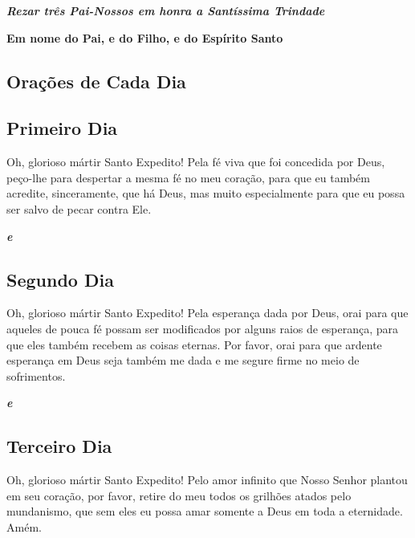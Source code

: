 \documentclass[18pt]{article}
\begin{document}
\begin{justify}
\textbf{\textit{Rezar três Pai-Nossos em honra a Santíssima Trindade}}

\textbf{Em nome do Pai, e do Filho, e do Espírito Santo}

\vfill

\subsection{Orações de Cada Dia}



\subsection*{Primeiro Dia}

\textbf{\textit{}} %

Oh, glorioso mártir Santo Expedito! Pela fé viva que foi concedida por Deus, peço-lhe para despertar a mesma fé no meu coração, para que eu também acredite, sinceramente, que há Deus, mas muito especialmente para que eu possa ser salvo de pecar contra Ele.

\textbf{\textit{ e }} %

\subsection*{Segundo Dia}

\textbf{\textit{}} %

Oh, glorioso mártir Santo Expedito! Pela esperança dada por Deus, orai para que aqueles de pouca fé possam ser modificados por alguns raios de esperança, para que eles também recebem as coisas eternas. Por favor, orai para que ardente esperança em Deus seja também me dada e me segure firme no meio de sofrimentos.

\textbf{\textit{ e }} %

\subsection*{Terceiro Dia}

\textbf{\textit{}} %

Oh, glorioso mártir Santo Expedito! Pelo amor infinito que Nosso Senhor plantou em seu coração, por favor, retire do meu todos os grilhões atados pelo mundanismo, que sem eles eu possa amar somente a Deus em toda a eternidade. Amém.


\end{justify}
\end{document}
